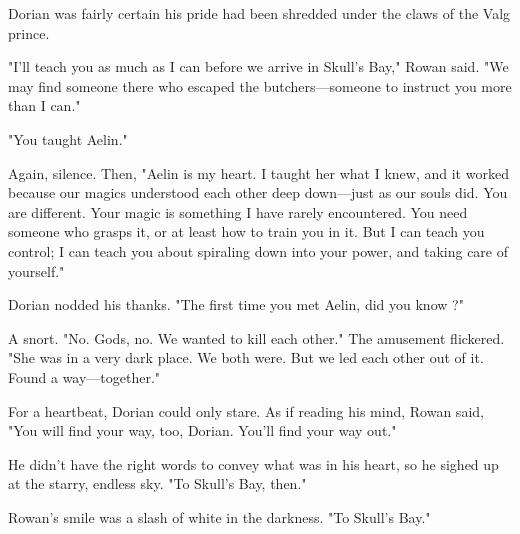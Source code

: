 Dorian was fairly certain his pride had been shredded under the claws of the Valg prince.

"I'll teach you as much as I can before we arrive in Skull's Bay," Rowan said. "We may find someone there who escaped the butchers---someone to instruct you more than I can."

"You taught Aelin."

Again, silence. Then, "Aelin is my heart. I taught her what I knew, and it worked because our magics understood each other deep down---just as our souls did. You are  different. Your magic is something I have rarely encountered. You need someone who grasps it, or at least how to train you in it. But I can teach you control; I can teach you about spiraling down into your power, and taking care of yourself."

Dorian nodded his thanks. "The first time you met Aelin, did you know
 ?"

A snort. "No. Gods, no. We wanted to kill each other." The amusement flickered. "She was  in a very dark place. We both were. But we led each other out of it. Found a way---together."

For a heartbeat, Dorian could only stare. As if reading his mind, Rowan said, "You will find your way, too, Dorian. You'll find your way out."

He didn't have the right words to convey what was in his heart, so he sighed up at the starry, endless sky. "To Skull's Bay, then."

Rowan's smile was a slash of white in the darkness. "To Skull's Bay."

